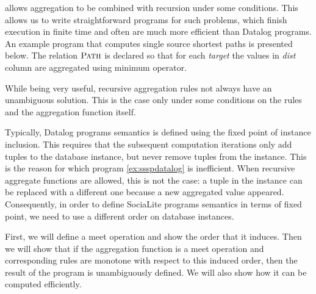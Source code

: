 
\datalogra allows aggregation to be combined with recursion under some conditions. This allows us to write straightforward programs for such problems, which finish execution in finite time and often are much more efficient than Datalog programs. An example \datalogra program that computes single source shortest paths is presented below. The relation $\textsc{Path}$ is declared so that for each \textit{target} the values in \textit{dist} column are aggregated using minimum operator.



While being very useful, recursive aggregation rules not always have an unambiguous solution. This is the case only under some conditions on the rules and the aggregation function itself.

Typically, Datalog programs semantics is defined using the fixed point of instance inclusion. This requires that the subsequent computation iterations only add tuples to the database instance, but never remove tuples from the instance. This is the reason for which program \ref{ex:ssspdatalog} is inefficient. When recursive aggregate functions are allowed, this is not the case: a tuple in the instance can be replaced with a different one because a new aggregated value appeared. Consequently, in order to define SociaLite programs semantics in terms of fixed point, we need to use a different order on database instances.

First, we will define a meet operation and show the order that it induces. Then we will show that if the aggregation function is a meet operation and corresponding rules are monotone with respect to this induced order, then the result of the program is unambiguously defined. We will also show how it can be computed efficiently.

